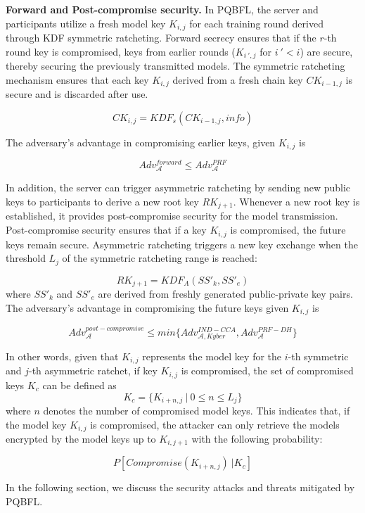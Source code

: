 \documentclass[a4paper,fleqn]{cas-dc}
\begin{document}
\noindent\textbf{Forward and Post-compromise security.}
In PQBFL, the server and participants utilize a fresh model key $K_{i,j}$ for each training round derived through KDF symmetric ratcheting.  
Forward secrecy ensures that if the $r$-th round key is compromised, keys from earlier rounds ($K_{i\ ',j}$ for $i\ '<i$) are secure, thereby securing the previously transmitted models. 
The symmetric ratcheting mechanism ensures that each key $K_{i,j}$ derived from a fresh chain key $CK_{i-1,j}$ is secure and is discarded after use.  

$$     
    CK_{i,j}=KDF_{s}(CK_{i-1,j},info) 
$$  
 
The adversary’s advantage in compromising earlier keys, given $K_{i,j}$ is  
 
$$     
    Adv_{\mathcal{A}}^{forward} \leq Adv_{\mathcal{A}}^{PRF} 
$$ 

In addition, the server can trigger asymmetric ratcheting by sending new public keys to participants to derive a new root key $RK_{j+1}$.   
Whenever a new root key is established, it provides post-compromise security for the model transmission. 
Post-compromise security ensures that if a key $K_{i,j}$ is compromised, the future keys remain secure. 
Asymmetric ratcheting triggers a new key exchange when the threshold $L_{j}$ of the symmetric ratcheting range is reached:

$$      
    RK_{j+1}=KDF_{A}(SS'_{k},SS'_{e}) 
$$  
where  $SS'_{k}$ and $SS'_{e}$ are derived from freshly generated public-private key pairs. 
The adversary’s advantage in compromising the future keys given $K_{i,j}$ is  

$$     
    Adv_{\mathcal{A}}^{post-compromise} \leq min\{ Adv_{\mathcal{A},Kyber}^{IND-CCA}, Adv_{\mathcal{A}}^{PRF-DH}\} 
$$ 

In other words, given that $K_{i,j}$ represents the model key for the $i$-th symmetric and $j$-th asymmetric ratchet, if key $K_{i,j}$ is compromised, the set of compromised keys $K_{c}$ can be defined as  
$$     
    K_{c}=\{K_{i+n,j} \ | \ 0\leq n \leq L_{j}\} 
$$  
\noindent where $n$ denotes the number of compromised model keys. This indicates that, if the model key $K_{i,j}$ is compromised, the attacker can only retrieve the models encrypted by the model keys up to $K_{i,j+1}$ with the following probability:  

$$ 
    P[Compromise(K_{i+n,j})\ | K_{c}] 
$$

In the following section, we discuss the security attacks and threats mitigated by PQBFL.
\end{document}
